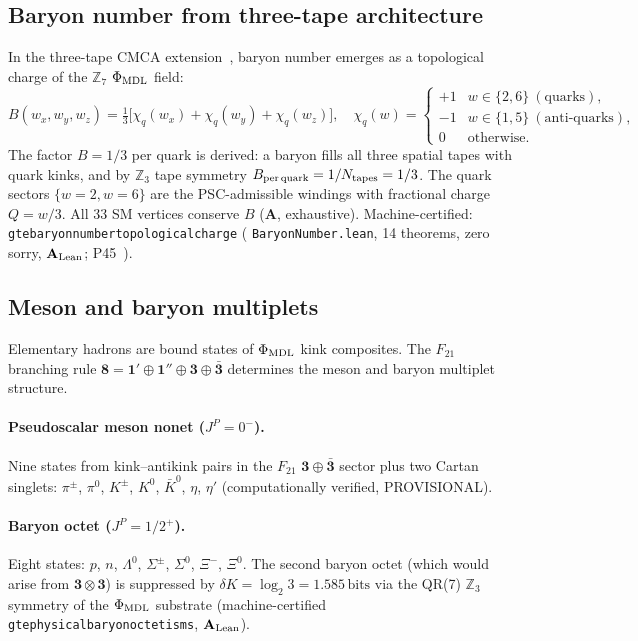 \documentclass[11pt]{article}
\theoremstyle{remark}
\newcommand{\ZZ}{\mathbb{Z}}
\newcommand{\phimdl}{\Phi_{\rm MDL}}
\newcommand{\Ftwentyone}{F_{21}}
\newcommand{\lean}[1]{%
  \penalty-100
  \begingroup\def\_{\textunderscore\allowbreak}\texttt{#1}\endgroup}
\newcommand{\CatA}{\textbf{A}}
\newcommand{\CatAL}{\ensuremath{\textbf{A}_{\rm Lean}}}
\begin{document}
\subsection{Baryon number from three-tape architecture}
\label{ssec:baryon_number}

In the three-tape CMCA extension~\cite{SpivackThreeTapeCMCA}, baryon number
emerges as a topological charge of the $\ZZ_7$ $\phimdl$ field:
\begin{equation}
  B(w_x, w_y, w_z)
  = \tfrac{1}{3}\bigl[\chi_q(w_x) + \chi_q(w_y) + \chi_q(w_z)\bigr],
  \quad
  \chi_q(w) =
  \begin{cases}
    +1 & w \in \{2, 6\}\ (\text{quarks}),\\
    -1 & w \in \{1, 5\}\ (\text{anti-quarks}),\\
    0  & \text{otherwise.}
  \end{cases}
\end{equation}
The factor $B = 1/3$ per quark is derived: a baryon fills all three spatial tapes with
quark kinks, and by $\mathbb{Z}_3$ tape symmetry $B_{\rm per\,quark} = 1/N_{\rm tapes} = 1/3$.
The quark sectors $\{w=2, w=6\}$ are the PSC-admissible windings with fractional charge
$Q = w/3$.  All 33 SM vertices conserve $B$ (\CatA, exhaustive).
Machine-certified: \lean{gte\_baryon\_number\_topological\_charge}
(\lean{BaryonNumber.lean}, 14 theorems, zero sorry, \CatAL; P45~\cite{SpivackThreeTapeCMCA}).

\subsection{Meson and baryon multiplets}
\label{ssec:multiplets}

Elementary hadrons are bound states of $\phimdl$ kink composites.
The $\Ftwentyone$ branching rule $\mathbf{8} = \mathbf{1}' \oplus \mathbf{1}''
\oplus \mathbf{3} \oplus \bar{\mathbf{3}}$ determines the meson and baryon
multiplet structure.

\paragraph{Pseudoscalar meson nonet ($J^P = 0^-$).}
Nine states from kink--antikink pairs in the $\Ftwentyone$
$\mathbf{3} \oplus \bar{\mathbf{3}}$ sector plus two Cartan singlets:
$\pi^\pm$, $\pi^0$, $K^\pm$, $K^0$, $\bar{K}^0$, $\eta$, $\eta'$
(computationally verified, PROVISIONAL).

\paragraph{Baryon octet ($J^P = 1/2^+$).}
Eight states: $p$, $n$, $\Lambda^0$, $\Sigma^\pm$, $\Sigma^0$, $\Xi^-$, $\Xi^0$.
The second baryon octet (which would arise from $\mathbf{3} \otimes \mathbf{3}$)
is suppressed by $\delta K = \log_2 3 = 1.585\,\text{bits}$ via the QR(7) $\ZZ_3$
symmetry of the $\phimdl$ substrate (machine-certified
\lean{gte\_physical\_baryon\_octet\_is\_ms}, \CatAL{}).
\end{document}
